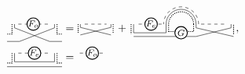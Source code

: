 \documentclass[aps,pra,groupedaddress,onecolumn,notitlepage,superscriptaddress,10pt]{revtex4-1}
\begin{document}
\begin{align}
\tikz[scale=.8,baseline=-1.5ex]{
    \draw[dashed] (-0.15,0) -- (1.15,0);
    \draw[thick,fill=white] (0.45,0) circle (0.25) node[anchor=center] {\footnotesize$F_o$};
    \draw (-0.3,0.0)-- (-0.3,-0.15);
    \draw (-0.3,-0.15)-- (1.1,-0.7);
    \draw (1.3,-0.15)-- (1.3,0.0);
    \draw (1.3,-0.15)-- (-0.1,-0.7);
    \draw (-0.6,-0.7)-- (-0.1,-0.7);
    \draw (1.1,-0.7)-- (1.6,-0.7);    \draw[densely dotted,thick]   (-0.4,0.0)-- (-0.4,-0.4)--  (-0.6,-0.4);
    \draw[densely dotted,thick] (1.4,0.0) -- (1.4,-0.4) -- (1.6,-0.4) ;
    }
=& \ 
\tikz[scale=0.7,baseline=-1.5ex]{
    \draw[dashed] (0,0) -- (1,0);
    \draw (-0.2,0.0)-- (-0.2,-0.15);
    \draw (-0.2,-0.15)-- (1.2,-0.5);
    \draw (1.2,-0.15)-- (1.2,0.0);
    \draw (1.2,-0.15)-- (-0.2,-0.5);
    \draw[densely dotted,thick] (-0.3,0.0)-- (-0.3,-0.4);
    \draw[densely dotted,thick] (1.3,-0.4)-- (1.3,0.0);
    }
  \,
+
 \,
\tikz[scale=0.8,baseline=-1.5ex]{
    \draw[dashed] (0,0) -- (1,0);
    \draw[thick,fill=white] (0.5,0) circle (0.25) node[anchor=center] {\footnotesize$F_e$};
    \draw (-0.2,0.)-- (-0.2,-0.35);
    \draw (1.1,0.)-- (1.1,-0.35);
    \draw[densely dotted,thick] (-0.3,0.)-- (-0.3,-0.4);
    \draw[densely dotted,thick] (1.2,-0.3)-- (1.2,0.);
    \draw[dashed] (2.5,0) -- (3.5,0);
    \draw (2.3,0.)-- (2.3,-0.15);
    \draw (2.3,-0.15)-- (3.8,-0.5);
    \draw (3.7,-0.15)-- (3.7,0.);
    \draw (3.7,-0.15)-- (2.3,-0.5);
    \draw[densely dotted,thick] (2.2,0.)-- (2.2,-0.3);
    \draw[densely dotted,thick] (3.8,-0.4)-- (3.8,0.);
    \draw[densely dotted,thick] (1.2,-0.3)--(2.2,-0.3);
    \draw (-0.2,-0.35)-- (1.1,-0.35);
    \draw (-0.2,-0.5)-- (2.3,-0.5);
    \draw[thick,fill=white] (1.7,-0.35) circle (0.25) node[anchor=center] {\footnotesize$G$};
    \draw[densely dotted,thick] (2.2,0) arc (0:180:0.5);
    \draw[dashed] (2.4,0) arc (0:180:0.7);
    \draw (2.3,0) arc (0:180:0.6);
 }\, , \\
\tikz[scale=.8,baseline=-1.5ex]{
    \draw[dashed] (-0.15,0) -- (1.15,0);
    \draw[thick,fill=white] (0.5,0) circle (0.25) node[anchor=center] {\footnotesize$F_e$};
    \draw (-0.3,0.0)-- (-0.3,-0.35)-- (1.3,-0.35) -- (1.3,0);
    \draw (-0.6,-0.55)-- (1.6,-0.55);
    \draw[densely dotted,thick]   (-0.4,0.0)-- (-0.4,-0.4)--  (-0.6,-0.4);
    \draw[densely dotted,thick] (1.4,0.0) -- (1.4,-0.4) -- (1.6,-0.4) ;
    }
=& 
\ \,
\tikz[scale=0.8,baseline=-1.5ex]{
    \draw[dashed] (0,0) -- (1,0);
    \draw[thick,fill=white] (0.5,0) circle (0.25) node[anchor=center] {\footnotesize$F_o$};
}
\end{align}
\end{document}
